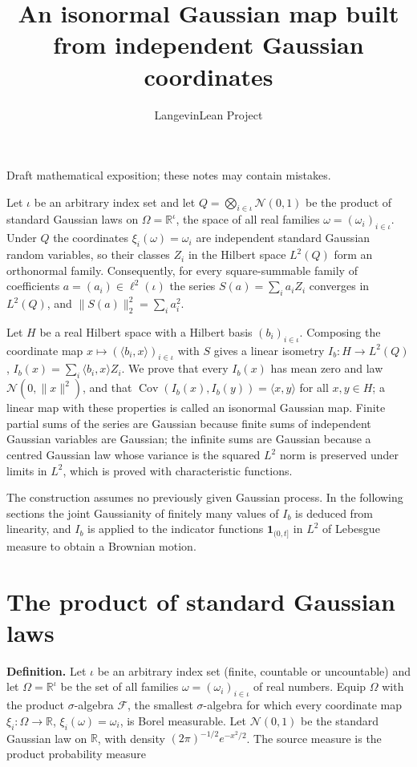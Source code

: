 \documentclass[11pt,a4paper]{article}
\title{\texorpdfstring{An isonormal Gaussian map built from independent Gaussian coordinates}{An isonormal Gaussian map built from independent Gaussian coordinates}}
\author{LangevinLean Project}
\date{}
\begin{document}
\maketitle
Draft mathematical exposition; these notes may contain mistakes.


Let \(\iota\) be an arbitrary index set and let \(Q=\bigotimes_{i\in\iota}\mathcal N(0,1)\) be the product of standard Gaussian laws on \(\Omega=\mathbb R^\iota\), the space of all real families \(\omega=(\omega_i)_{i\in\iota}\). Under \(Q\) the coordinates \(\xi_i(\omega)=\omega_i\) are independent standard Gaussian random variables, so their classes \(Z_i\) in the Hilbert space \(L^2(Q)\) form an orthonormal family. Consequently, for every square-summable family of coefficients \(a=(a_i)\in\ell^2(\iota)\) the series \(S(a)=\sum_ia_iZ_i\) converges in \(L^2(Q)\), and \(\|S(a)\|_2^2=\sum_ia_i^2\).




Let \(H\) be a real Hilbert space with a Hilbert basis \((b_i)_{i\in\iota}\). Composing the coordinate map \(x\mapsto(\langle b_i,x\rangle)_{i\in\iota}\) with \(S\) gives a linear isometry \(I_b:H\to L^2(Q)\), \(I_b(x)=\sum_i\langle b_i,x\rangle Z_i\). We prove that every \(I_b(x)\) has mean zero and law \(\mathcal N(0,\|x\|^2)\), and that \(\operatorname{Cov}(I_b(x),I_b(y))=\langle x,y\rangle\) for all \(x,y\in H\); a linear map with these properties is called an isonormal Gaussian map. Finite partial sums of the series are Gaussian because finite sums of independent Gaussian variables are Gaussian; the infinite sums are Gaussian because a centred Gaussian law whose variance is the squared \(L^2\) norm is preserved under limits in \(L^2\), which is proved with characteristic functions.




The construction assumes no previously given Gaussian process. In the following sections the joint Gaussianity of finitely many values of \(I_b\) is deduced from linearity, and \(I_b\) is applied to the indicator functions \(\mathbf 1_{(0,t]}\) in \(L^2\) of Lebesgue measure to obtain a Brownian motion.


\section{\texorpdfstring{The product of standard Gaussian laws}{The product of standard Gaussian laws}}


\textbf{Definition.} Let \(\iota\) be an arbitrary index set (finite, countable or uncountable) and let \(\Omega=\mathbb R^\iota\) be the set of all families \(\omega=(\omega_i)_{i\in\iota}\) of real numbers. Equip \(\Omega\) with the product \(\sigma\)-algebra \(\mathcal F\), the smallest \(\sigma\)-algebra for which every coordinate map \(\xi_i:\Omega\to\mathbb R\), \(\xi_i(\omega)=\omega_i\), is Borel measurable. Let \(\mathcal N(0,1)\) be the standard Gaussian law on \(\mathbb R\), with density \((2\pi)^{-1/2}e^{-x^2/2}\). The source measure is the product probability measure
\end{document}
